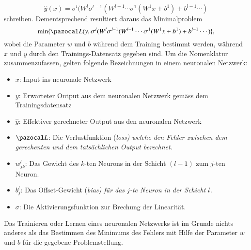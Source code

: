 \begin{equation}
\hat{y}(x) = \sigma^{l}(W^{l}\sigma^{l-1}(W^{l-1}\cdots \sigma^{1}(W^{1}x+b^{1}) + b^{l-1} \cdots )
\label{ableitung:eqn:full_net}
\end{equation}
schreiben. Dementsprechend resultiert daraus das Minimalproblem
\begin{equation}
	\min \{ \Lb(y, \sigma^{l}(W^{l}\sigma^{l-1}(W^{l-1}\cdots \sigma^{1}(W^{1}x+b^{1}) + b^{l-1} \cdots ) \} \text{,} %
\end{equation}
wobei die Parameter $w$ und $b$ während dem Training bestimmt werden, während $x$ und $y$ durch den Trainings-Datensatz gegeben sind.
Um die Nomenklatur zusammenzufassen, gelten folgende Bezeichnungen in einem neuronalen Netzwerk: 
\begin{itemize}
	\item{$x$: Input ins neuronale Netzwerk}
	\item{$y$: Erwarteter Output aus dem neuronalen Netzwerk gemäss dem Trainingsdatensatz}
	\item{$\hat{y}$: Effektiver gerechneter Output aus den neuronalen Netzwerk}
	\item{$\Lb$: Die Verlustfunktion (\em{loss}) welche den Fehler zwischen dem gerechenten und dem tatsächlichen Output berechnet.}
	\item{$w_{jk}^{l}$: Das Gewicht des $k$-ten Neurons in der Schicht $(l-1)$ zum $j$-ten Neuron.}
	\item{$b_{j}^{l}$: Das Offset-Gewicht (\em{bias}) für das $j$-te Neuron in der Schicht $l$.}
	\item{$\sigma$: Die Aktivierungsfunktion zur Brechung der Linearität.}
\end{itemize}
Das Trainieren oder Lernen eines neuronalen Netzwerks ist im Grunde
nichts anderes als das Bestimmen des Minimums des Fehlers mit Hilfe
der Parameter $w$ und $b$ für die gegebene Problemstellung.
%
%
